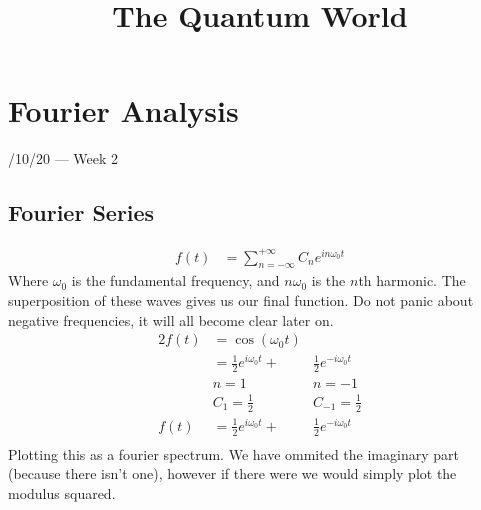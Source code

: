 \documentclass[11pt]{article}
\title{The Quantum World}
\date{}
\author{}
\newcommand{\thedate}[1]{\hfill{\small\sc #1}}
\let\oldRe\Re
\renewcommand\Re[1]{\oldRe\mathfrak{e}\left\{#1\right\}}
\begin{document}
\maketitle
\section{Fourier Analysis}\thedate{5/10/20 --- Week 2}
\subsection{Fourier Series}
    \begin{align*}
        f(t) &= \sum_{n=-\infty}^{+\infty} C_n e^{in\omega_0t}
    \end{align*}
    Where $\omega_0$ is the fundamental frequency, and $n\omega_0$ is the $n$th harmonic.
    The superposition of these waves gives us our final function. Do not panic about negative frequencies,
    it will all become clear later on.
    \begin{alignat*}{2}
        f(t) &= \cos(\omega_0t)\\
        &= \frac{1}{2}e^{i\omega_0t} +& \frac{1}{2}e^{-i\omega_0t}\\
        &n=1 & n=-1\\
        &C_1 = \frac{1}{2} &C_{-1} = \frac{1}{2}\\
        f(t) &= \frac{1}{2}e^{i\omega_0t} +& \frac{1}{2}e^{-i\omega_0t}\\
    \end{alignat*}
    Plotting this as a fourier spectrum. We have ommited the imaginary part (because there isn't one), however
    if there were we would simply plot the modulus squared.

    \begin{center}
    \end{center}
        
\end{document}
